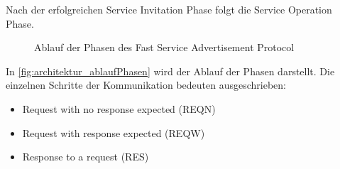 Nach der erfolgreichen Service Invitation Phase folgt die Service Operation Phase. 
\begin{figure} 
  \centering 
   \qquad 
  \caption{Ablauf der Phasen des Fast Service Advertisement Protocol \cite{iso24102-5}} 
  \label{fig:architektur_ablaufPhasen}
\end{figure}

In \autoref{fig:architektur_ablaufPhasen} wird der Ablauf der Phasen darstellt. Die einzelnen Schritte der Kommunikation bedeuten ausgeschrieben:
\begin{itemize}
	\item Request with no response expected (REQN)
	\item Request with response expected (REQW)
	\item Response to a request (RES)
\end{itemize}


